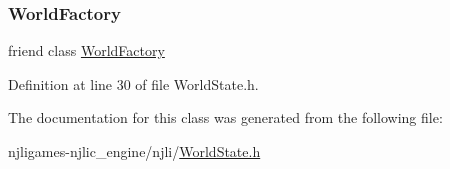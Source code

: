 \subsubsection{\texorpdfstring{World\+Factory}{WorldFactory}}
{\footnotesize\ttfamily friend class \mbox{\hyperlink{classnjli_1_1_world_factory}{World\+Factory}}\hspace{0.3cm}{\ttfamily [friend]}}



Definition at line 30 of file World\+State.\+h.



The documentation for this class was generated from the following file\+:\begin{DoxyCompactItemize}
\item 
njligames-\/njlic\+\_\+engine/njli/\mbox{\hyperlink{_world_state_8h}{World\+State.\+h}}\end{DoxyCompactItemize}
